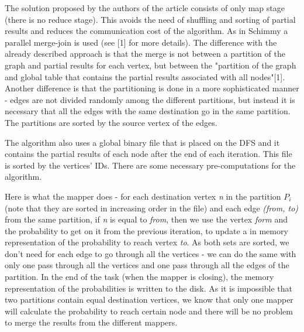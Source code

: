 \documentclass[12pt]{article}
\theoremstyle{plain}
\begin{document}
  The solution proposed by the authors of the article consists of only map
  stage (there is no reduce stage).  This avoids the need of shuffling and
  sorting of partial results and reduces the communication cost of the
  algorithm. As in Schimmy a parallel merge-join is used (see [1] for more
  details). The difference with the already described approach is that the
  merge is not between a partition of the graph and partial results for each
  vertex, but between the "partition of the graph and global table that
  contains the partial results associated with all nodes"[1]. Another
  difference is that the partitioning is done in a more sophisticated manner -
  edges are not divided randomly among the different partitions, but instead it
  is necessary that all the edges with the same destination go in the same
  partition. The partitions are sorted by the source vertex of the edges. 

  The algorithm also uses a global binary file that is placed on the DFS and it
  contains the partial results of each node after the end of each iteration. 
  This file is sorted by the vertices' IDs. There are some necessary
  pre-computations for the algorithm.  

  Here is what the mapper does - for each destination vertex \emph{n} in the
  partition $P_i$ (note that they are sorted in increasing order in the file)
  and each edge \emph{(from, to)} from the same partition, if \emph{n} is equal
  to \emph{from}, then we use the vertex \emph{form} and the probability to
  get on it from the previous iteration, to update a in memory representation
  of the probability to reach vertex \emph{to}. As both sets are sorted, we
  don't need for each edge to go through all the vertices - we can do the same
  with only one pass through all the vertices and one pass through all the
  edges of the partition. In the end of the task (when the mapper is closing),
  the memory representation of the probabilities is written to the disk. As it
  is impossible that two partitions contain equal destination vertices, we
  know that only one mapper will calculate the probability to reach certain
  node and there will be no problem to merge the results from the different
  mappers. 
\end{document}

